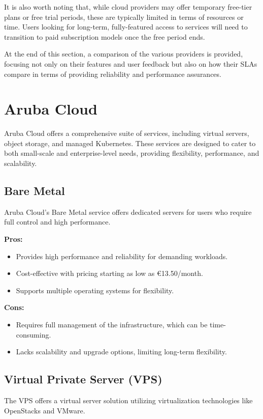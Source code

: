 It is also worth noting that, while cloud providers may offer temporary free-tier plans or free trial periods, these are typically limited in terms of resources or time. Users looking for long-term, fully-featured access to services will need to transition to paid subscription models once the free period ends.

At the end of this section, a comparison of the various providers is provided, focusing not only on their features and user feedback but also on how their SLAs compare in terms of providing reliability and performance assurances.


\section{Aruba Cloud}
\label{aruba-cloud}

Aruba Cloud offers a comprehensive suite of services, including virtual servers, object storage, and managed Kubernetes\cite{site:kubernetes}. These services are designed to cater to both small-scale and enterprise-level needs, providing flexibility, performance, and scalability.

\subsection*{Bare Metal}
Aruba Cloud's Bare Metal service offers dedicated servers for users who require full control and high performance.

\textbf{Pros:}
\begin{itemize}
    \item Provides high performance and reliability for demanding workloads.
    \item Cost-effective with pricing starting as low as €13.50/month.
    \item Supports multiple operating systems for flexibility.
\end{itemize}

\textbf{Cons:}
\begin{itemize}
    \item Requires full management of the infrastructure, which can be time-consuming.
    \item Lacks scalability and upgrade options, limiting long-term flexibility.
\end{itemize}

\subsection*{Virtual Private Server (VPS)}
The VPS offers a virtual server solution utilizing virtualization technologies like OpenStacks and VMware.

